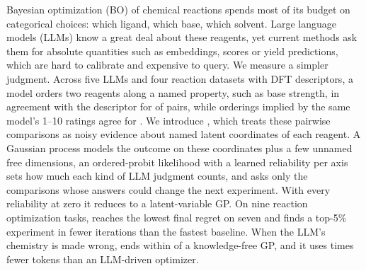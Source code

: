 Bayesian optimization (BO) of chemical reactions spends most of its budget on categorical choices: which ligand, which base, which solvent. Large language models (LLMs) know a great deal about these reagents, yet current methods ask them for absolute quantities such as embeddings, scores or yield predictions, which are hard to calibrate and expensive to query. We measure a simpler judgment. Across five LLMs and four reaction datasets with DFT descriptors, a model orders two reagents along a named property, such as base strength, in agreement with the descriptor for \PairAccPct{} of pairs, while orderings implied by the same model's 1--10 ratings agree for \RateAccPct{}. We introduce \ours{}, which treats these pairwise comparisons as noisy evidence about named latent coordinates of each reagent. A Gaussian process models the outcome on these coordinates plus a few unnamed free dimensions, an ordered-probit likelihood with a learned reliability per axis sets how much each kind of LLM judgment counts, and \ours{} asks only the comparisons whose answers could change the next experiment. With every reliability at zero it reduces to a latent-variable GP. On nine reaction optimization tasks, \ours{} reaches the lowest final regret on seven and finds a top-5\% experiment in \IReduction{} fewer iterations than the fastest baseline. When the LLM's chemistry is made wrong, \ours{} ends within \CfGapPct{} of a knowledge-free GP, and it uses \TokLLMGO{} times fewer tokens than an LLM-driven optimizer.
